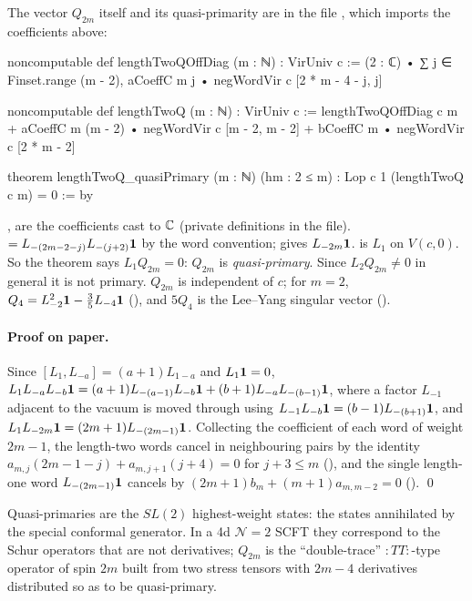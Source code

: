 \noindent The vector $Q_{2m}$ itself and its quasi-primarity are in the file
, which imports the
coefficients above:
\begin{leancode}
noncomputable def lengthTwoQOffDiag (m : ℕ) : VirUniv c :=
  (2 : ℂ) • ∑ j ∈ Finset.range (m - 2),
    aCoeffC m j • negWordVir c [2 * m - 4 - j, j]

noncomputable def lengthTwoQ (m : ℕ) : VirUniv c :=
  lengthTwoQOffDiag c m
    + aCoeffC m (m - 2) • negWordVir c [m - 2, m - 2]
    + bCoeffC m • negWordVir c [2 * m - 2]

theorem lengthTwoQ_quasiPrimary (m : ℕ) (hm : 2 ≤ m) :
    Lop c 1 (lengthTwoQ c m) = 0 := by
\end{leancode}

\begin{dictionary}
,  are the coefficients cast to ${\mathbb{C}}$ (private definitions in the file).
 $= L_{-(2m-2-j)}L_{-(j+2)}\mathbf{1}$ by the word convention;
\lean{[2*m-2]} gives $L_{-2m}\mathbf{1}$.  is $L_1$ on $V(c,0)$. So the theorem says
$L_1Q_{2m} = 0$: $Q_{2m}$ is \emph{quasi-primary}. Since $L_2Q_{2m}\ne0$ in general it is not primary.
$Q_{2m}$ is independent of $c$; for $m=2$, $Q_4 = L_{-2}^2\mathbf{1}-\tfrac35L_{-4}\mathbf{1}$
(), and $5Q_4$ is the Lee--Yang singular vector ().
\end{dictionary}

\paragraph{Proof on paper.} Since $[L_1,L_{-a}] = (a+1)L_{1-a}$ and $L_1\mathbf{1} = 0$,
$L_1L_{-a}L_{-b}\mathbf{1} = (a+1)L_{-(a-1)}L_{-b}\mathbf{1} + (b+1)L_{-a}L_{-(b-1)}\mathbf{1}$, where a factor
$L_{-1}$ adjacent to the vacuum is moved through using $L_{-1}L_{-b}\mathbf{1} = (b-1)L_{-(b+1)}\mathbf{1}$, and
$L_1L_{-2m}\mathbf{1} = (2m+1)L_{-(2m-1)}\mathbf{1}$. Collecting the coefficient of each word of weight $2m-1$,
the length-two words cancel in neighbouring pairs by the identity
$a_{m,j}(2m-1-j) + a_{m,j+1}(j+4) = 0$ for $j+3\le m$ (), and the single
length-one word $L_{-(2m-1)}\mathbf{1}$ cancels by $(2m+1)b_m + (m+1)a_{m,m-2} = 0$
(). \qed

\begin{physics}
Quasi-primaries are the $SL(2)$ highest-weight states: the states annihilated by the special conformal
generator. In a 4d $\mathcal N=2$ SCFT they correspond to the Schur operators that are not derivatives;
$Q_{2m}$ is the ``double-trace'' $:TT:$-type operator of spin $2m$ built from two stress tensors with
$2m-4$ derivatives distributed so as to be quasi-primary.
\end{physics}


